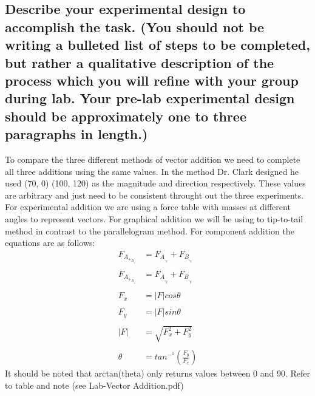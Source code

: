 \documentclass{article}
\begin{document}
\subsection*{Describe your experimental design to accomplish the task. (You should not be writing a bulleted list of steps to be completed, but rather a qualitative description of the process which you will refine with your group during lab. Your pre-lab experimental design should be approximately one to three paragraphs in length.)}
    To compare the three different methods of vector addition we need to complete all three additions using the same values. In the method Dr. Clark designed he used (70, 0) (100, 120) as the magnitude and direction respectively. These values are arbitrary and just need to be consistent throught out the three experiments. For experimental addition we are using a force table with masses at different angles to represent vectors. For graphical addition we will be using to tip-to-tail method in contrast to the parallelogram method. For component addition the equations are as follows: 
\begin{align}
    F_A_+_B_,_x &= F_A_,_x + F_B_,_x \nonumber\\\nonumber \\
    F_A_+_B_,_y &= F_A_,_y + F_B_,_y \nonumber\\ \nonumber\\
    F_x &= |F|cos\theta \nonumber\\ \nonumber\\ 
    F_y &= |F|sin\theta \nonumber\\ \nonumber\\ 
    |F| &= \sqrt{F_x^2 + F_y^2} \nonumber\\ \nonumber\\ 
    \theta &= tan^-^1(\frac{F_y}{F_x}) \nonumber 
\end{align}
It should be noted that arctan(theta) only returns values between 0 and 90. Refer to table and note (see Lab-Vector Addition.pdf)
 
\end{document}
